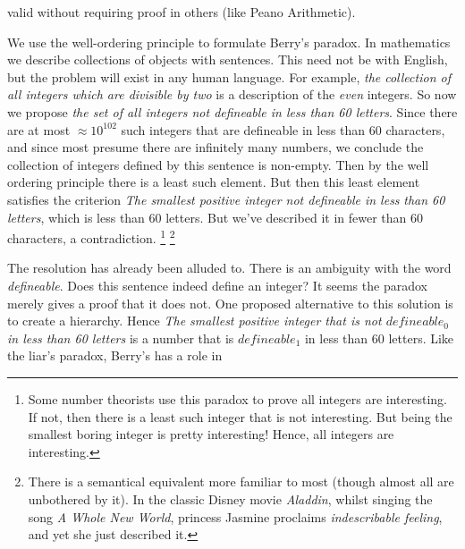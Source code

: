         valid without requiring proof in others (like Peano Arithmetic).
        \par\hfill\par
        We use the well-ordering principle to formulate Berry's paradox. In
        mathematics we describe collections of objects with sentences. This need
        not be with English, but the problem will exist in any human language.
        For example,
        \textit{the collection of all integers which are divisible by two} is a
        description of the \textit{even} integers. So now we propose
        \textit{the set of all integers not defineable in less than 60 letters}.
        Since there are at most $\approx{10}^{102}$ such integers that are
        defineable in less than 60 characters, and since most presume there are
        infinitely many numbers, we conclude the collection of integers defined
        by this sentence is non-empty. Then by the well ordering principle there
        is a least such element. But then this least element satisfies the
        criterion \textit{The smallest positive integer not defineable in less}
        \textit{than 60 letters}, which is less than 60 letters. But we've
        described it in fewer than 60 characters, a contradiction.%
        \footnote{%
            Some number theorists use this paradox to prove all integers are
            interesting. If not, then there is a least such integer that is
            not interesting. But being the smallest boring integer is pretty
            interesting! Hence, all integers are interesting.%
        }
        \footnote{%
            There is a semantical equivalent more familiar to most (though
            almost all are unbothered by it). In the classic Disney movie
            \textit{Aladdin}, whilst singing the song
            \textit{A Whole New World}, princess Jasmine proclaims
            \textit{indescribable feeling}, and yet she just described it.
        }
        \par\hfill\par
        The resolution has already been alluded to. There is an ambiguity with
        the word \textit{defineable}. Does this sentence indeed define an
        integer? It seems the paradox merely gives a proof that it does not. One
        proposed alternative to this solution is to create a hierarchy. Hence
        \textit{The smallest positive integer that is not $defineable_{0}$}
        \textit{in less than 60 letters} is a number that is $defineable_{1}$ in
        less than 60 letters. Like the liar's paradox, Berry's has a role in
